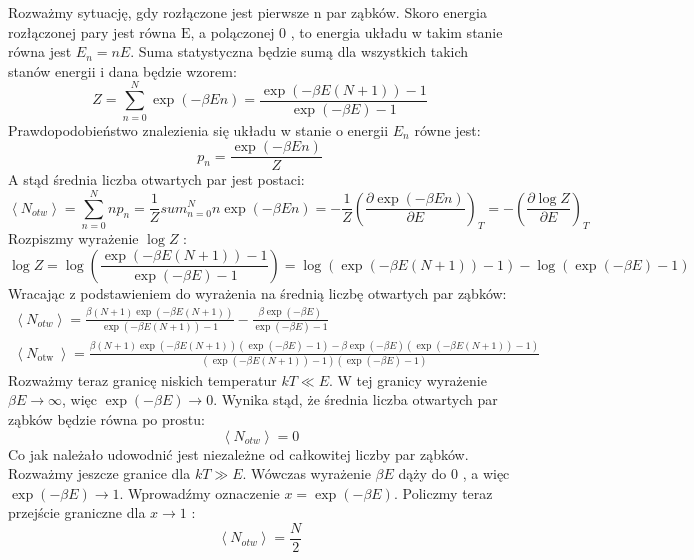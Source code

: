 \documentclass[12pt,a4paper]{article}
\begin{document}
Rozważmy sytuację, gdy rozłączone jest pierwsze n par ząbków. Skoro energia rozłączonej pary jest równa $\mathrm{E}$, a polączonej 0 , to energia układu w takim stanie równa jest $E_{n}=n E$. Suma statystyczna będzie sumą dla wszystkich takich stanów energii i dana będzie wzorem:
$$
Z=\sum_{n=0}^{N} \exp (-\beta E n)=\frac{\exp (-\beta E(N+1))-1}{\exp (-\beta E)-1}
$$
Prawdopodobieństwo znalezienia się układu w stanie o energii $E_{n}$ równe jest:
$$
p_{n}=\frac{\exp (-\beta E n)}{Z}
$$
A stąd średnia liczba otwartych par jest postaci:
$$
\left\langle N_{o t w}\right\rangle=\sum_{n=0}^{N} n p_{n}=\frac{1}{Z} s u m_{n=0}^{N} n \exp (-\beta E n)=-\frac{1}{Z}\left(\frac{\partial \exp (-\beta E n)}{\partial E}\right)_{T}=-\left(\frac{\partial \log Z}{\partial E}\right)_{T}
$$
Rozpiszmy wyrażenie $\log Z$ :
$$
\log Z=\log \left(\frac{\exp (-\beta E(N+1))-1}{\exp (-\beta E)-1}\right)=\log (\exp (-\beta E(N+1))-1)-\log (\exp (-\beta E)-1)
$$
Wracając z podstawieniem do wyrażenia na średnią liczbę otwartych par ząbków:
$$
\begin{gathered}
\left\langle N_{o t w}\right\rangle=\frac{\beta(N+1) \exp (-\beta E(N+1))}{\exp (-\beta E(N+1))-1}-\frac{\beta \exp (-\beta E)}{\exp (-\beta E)-1} \\
\left\langle N_{\text {otw }}\right\rangle=\frac{\beta(N+1) \exp (-\beta E(N+1))(\exp (-\beta E)-1)-\beta \exp (-\beta E)(\exp (-\beta E(N+1))-1)}{(\exp (-\beta E(N+1))-1)(\exp (-\beta E)-1)}
\end{gathered}
$$
Rozważmy teraz granicę niskich temperatur $k T \ll E$. W tej granicy wyrażenie $\beta E \rightarrow \infty$, więc $\exp (-\beta E) \rightarrow 0$. Wynika stąd, że średnia liczba otwartych par ząbków będzie równa po prostu:
$$
\left\langle N_{o t w}\right\rangle=0
$$
Co jak należało udowodnić jest niezależne od całkowitej liczby par ząbków.
Rozważmy jeszcze granice dla $k T \gg E$. Wówczas wyrażenie $\beta E$ dąży do 0 , a więc $\exp (-\beta E) \rightarrow 1$. Wprowadźmy oznaczenie $x=\exp (-\beta E)$. Policzmy teraz przejście graniczne dla $x \rightarrow 1$ :
$$
\left\langle N_{o t w}\right\rangle=\frac{N}{2}
$$
\end{document}
